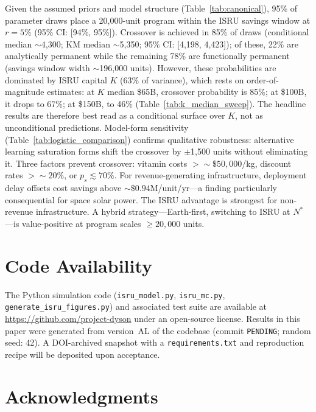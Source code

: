 \documentclass[preprint,12pt]{elsarticle}
\begin{document}
Given the assumed priors and model structure (Table~\ref{tab:canonical}), 95\% of parameter draws place a 20{,}000-unit program within the ISRU savings window at $r = 5\%$ (95\% CI: [94\%, 95\%]). Crossover is achieved in 85\% of draws (conditional median ${\sim}$4{,}300; KM median ${\sim}$5{,}350; 95\% CI: [4{,}198, 4{,}423]); of these, 22\% are analytically permanent while the remaining 78\% are functionally permanent (savings window width ${\sim}$196{,}000 units). However, these probabilities are dominated by ISRU capital $K$ (63\% of variance), which rests on order-of-magnitude estimates: at $K$ median \$65B, crossover probability is 85\%; at \$100B, it drops to 67\%; at \$150B, to 46\% (Table~\ref{tab:k_median_sweep}). The headline results are therefore best read as a conditional surface over $K$, not as unconditional predictions. Model-form sensitivity (Table~\ref{tab:logistic_comparison}) confirms qualitative robustness: alternative learning saturation forms shift the crossover by $\pm$1{,}500 units without eliminating it. Three factors prevent crossover: vitamin costs $> {\sim}\$50{,}000$/kg, discount rates $> {\sim}20\%$, or $p_s \lesssim 70\%$. For revenue-generating infrastructure, deployment delay offsets cost savings above ${\sim}\$0.94$M/unit/yr---a finding particularly consequential for space solar power. The ISRU advantage is strongest for non-revenue infrastructure. A hybrid strategy---Earth-first, switching to ISRU at $N^*$---is value-positive at program scales $\geq 20{,}000$ units.

\section*{Code Availability}

The Python simulation code (\texttt{isru\_model.py}, \texttt{isru\_mc.py}, \texttt{generate\_isru\_figures.py}) and associated test suite are available at \url{https://github.com/project-dyson} under an open-source license. Results in this paper were generated from version~AL of the codebase (commit \texttt{PENDING}; random seed: 42). A DOI-archived snapshot with a \texttt{requirements.txt} and reproduction recipe will be deposited upon acceptance.


\section*{Acknowledgments}
\end{document}
